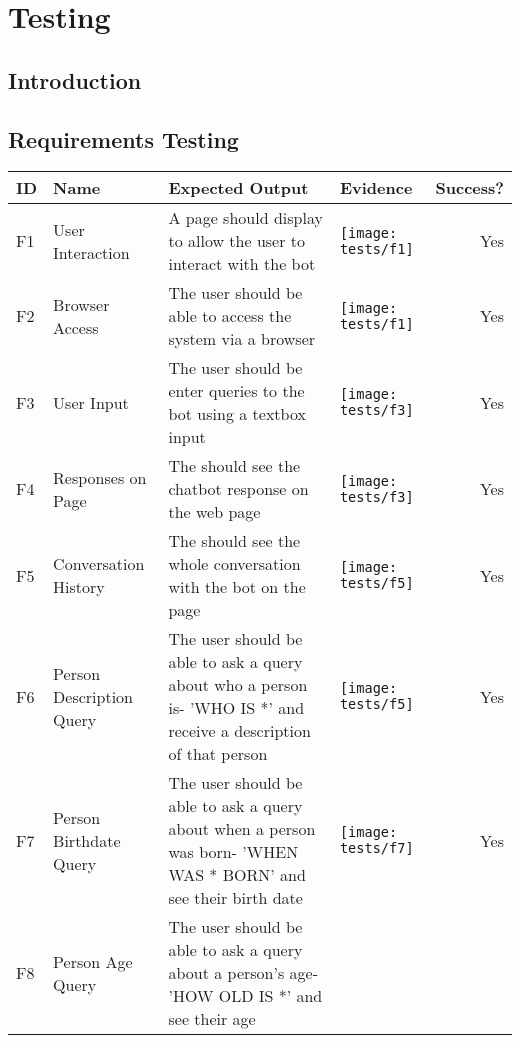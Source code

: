 \chapter{Testing}
\label{ch:testing}
\section{Introduction}
\newpage

\begin{landscape}
	\section{Requirements Testing}
	\begin{tabularx}{\hsize}{lXXXr}
		\toprule
		ID & Name & Expected Output & Evidence & Success? \\
		\midrule
		F1 & User Interaction 
		& A page should display to allow the user to interact with the bot
		& \texttt{[image: tests/f1]} & Yes \\
		\midrule
		F2 & Browser Access
		& The user should be able to access the system via a browser
		& \texttt{[image: tests/f1]} & Yes \\
		\midrule
		F3 & User Input
		& The user should be enter queries to the bot using a textbox input
		& \texttt{[image: tests/f3]} & Yes \\
		\bottomrule
		F4 & Responses on Page
		& The should see the chatbot response on the web page
		& \texttt{[image: tests/f3]} & Yes \\
		\bottomrule
		F5 & Conversation History
		& The should see the whole conversation with the bot on the page
		& \texttt{[image: tests/f5]} & Yes \\
		\bottomrule
		F6 & Person Description Query
		& The user should be able to ask a query about who a person is\newline - 'WHO IS *' and receive a description of that person
		& \texttt{[image: tests/f5]} & Yes \\
		\bottomrule
		F7 & Person Birthdate Query
		& The user should be able to ask a query about when a person was born\newline - 'WHEN WAS * BORN' and see their birth date
		& \texttt{[image: tests/f7]} & Yes \\
		\bottomrule
		F8 & Person Age Query
		& The user should be able to ask a query about a person's age\newline - 'HOW OLD IS *' and see their age

\end{tabularx}
\end{landscape}
